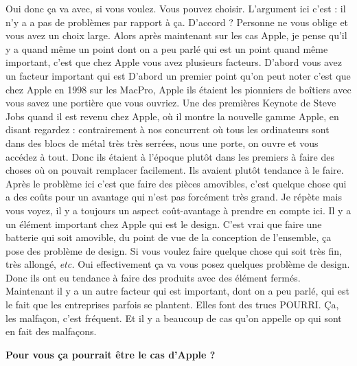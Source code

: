 \begin{small}
Oui donc ça va avec, si vous voulez. Vous pouvez choisir. L'argument ici c'est : il n'y a a pas de problèmes par rapport à ça. D'accord ? Personne ne vous oblige et vous avez un choix large. Alors après maintenant sur les cas Apple, je pense qu'il y a quand même un point dont on a peu parlé qui est un point quand même important, c'est que chez Apple vous avez plusieurs facteurs. D'abord vous avez un facteur important qui est 
D'abord un premier point qu'on peut noter c'est que chez Apple en 1998 sur les MacPro, Apple ils étaient les pionniers de boîtiers avec vous savez une portière que vous ouvriez. Une des premières Keynote de Steve Jobs quand il est revenu chez Apple, où il montre la nouvelle gamme Apple, en disant regardez : contrairement à nos concurrent où tous les ordinateurs sont dans des blocs de métal très très serrées, nous une porte, on ouvre et vous accédez à tout. Donc ils étaient à l'époque plutôt dans les premiers à faire des choses où on pouvait remplacer facilement. Ils avaient plutôt tendance à le faire.
Après le problème ici c'est que faire des pièces amovibles, c'est quelque chose qui a des coûts pour un avantage qui n'est pas forcément très grand. Je répète mais vous voyez, il y a toujours un aspect coût-avantage à prendre en compte ici. 
Il y a un élément important chez Apple qui est le design. C'est vrai que faire une batterie qui soit amovible, du point de vue de la conception de l'ensemble, ça pose des problème de design. Si vous voulez faire quelque chose qui soit très fin, très allongé, \textit{etc.} Oui effectivement ça va vous posez quelques problème de design. Donc ils ont eu tendance à faire des produits avec des élément fermés.
Maintenant il y a un autre facteur qui est important, dont on a peu parlé, qui est le fait que les entreprises parfois se plantent. Elles font des trucs POURRI. Ça, les malfaçon, c'est fréquent. Et il y a beaucoup de cas qu'on appelle op qui sont en fait des malfaçons.

\textbf{Pour vous ça pourrait être le cas d'Apple ?}
\smallbreak



\end{small}
